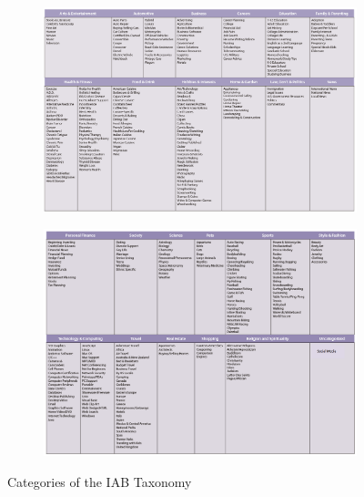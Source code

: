 %
\begin{figure}[t]
\begin{subfigure}{\textwidth}
\includegraphics[width=\textwidth]{Chapters/Background/Taxonomy-1.png}
\end{subfigure}
\begin{subfigure}{\textwidth}
\centering
\includegraphics[width=\textwidth]{Chapters/Background/Taxonomy-2.png}
\end{subfigure}
\caption{Categories of the IAB Taxonomy}
\label{fig:IAB}
\end{figure}




